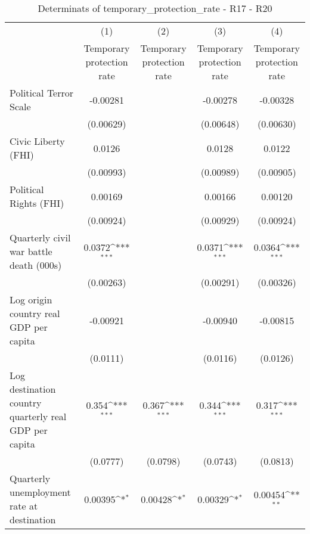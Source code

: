 \begin{table}[htbp]\centering
\def\sym#1{\ifmmode^{#1}\else\(^{#1}\)\fi}
\caption{Determinats of temporary\_protection\_rate - R17 - R20}
\begin{tabular}{l*{4}{c}}
\hline\hline
                    &\multicolumn{1}{c}{(1)}&\multicolumn{1}{c}{(2)}&\multicolumn{1}{c}{(3)}&\multicolumn{1}{c}{(4)}\\
                    &\multicolumn{1}{c}{Temporary protection rate}&\multicolumn{1}{c}{Temporary protection rate}&\multicolumn{1}{c}{Temporary protection rate}&\multicolumn{1}{c}{Temporary protection rate}\\
\hline
Political Terror Scale&    -0.00281         &                     &    -0.00278         &    -0.00328         \\
                    &   (0.00629)         &                     &   (0.00648)         &   (0.00630)         \\
[1em]
Civic Liberty (FHI) &      0.0126         &                     &      0.0128         &      0.0122         \\
                    &   (0.00993)         &                     &   (0.00989)         &   (0.00905)         \\
[1em]
Political Rights (FHI)&     0.00169         &                     &     0.00166         &     0.00120         \\
                    &   (0.00924)         &                     &   (0.00929)         &   (0.00924)         \\
[1em]
Quarterly civil war battle death (000s)&      0.0372\sym{***}&                     &      0.0371\sym{***}&      0.0364\sym{***}\\
                    &   (0.00263)         &                     &   (0.00291)         &   (0.00326)         \\
[1em]
Log origin country real GDP per capita&    -0.00921         &                     &    -0.00940         &    -0.00815         \\
                    &    (0.0111)         &                     &    (0.0116)         &    (0.0126)         \\
[1em]
Log destination country quarterly real GDP per capita&       0.354\sym{***}&       0.367\sym{***}&       0.344\sym{***}&       0.317\sym{***}\\
                    &    (0.0777)         &    (0.0798)         &    (0.0743)         &    (0.0813)         \\
[1em]
Quarterly unemployment rate at destination&     0.00395\sym{*}  &     0.00428\sym{*}  &     0.00329\sym{*}  &     0.00454\sym{**} \\

\end{tabular}
\end{table}
